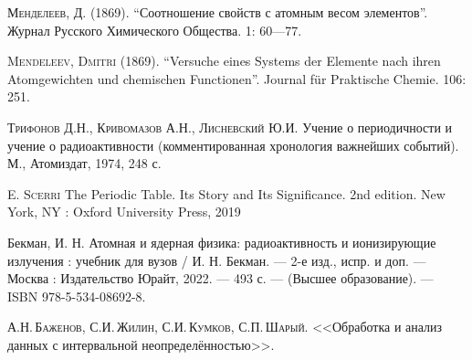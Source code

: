 \documentclass[a5paper,openany]{book}
\begin{document}
			\begin{thebibliography}{00}
				\textsc{Менделеев, Д.} (1869). “Соотношение свойств с атомным весом элементов”. Журнал Русского Химического Общества. 1: 60—77.
				
				\textsc{Mendeleev, Dmitri} (1869). “Versuche eines Systems der Elemente nach ihren Atomgewichten und chemischen Functionen”. Journal für Praktische Chemie. 106: 251.
				
				\textsc{Трифонов Д.Н., Кривомазов А.Н., Лисневский Ю.И.} Учение о периодичности и учение о радиоактивности (комментированная хронология важнейших событий). М., Атомиздат, 1974, 248 с.
				
				\textsc{E. Scerri}
				The Periodic Table. Its Story and Its Significance. 
				2nd edition.  New York, NY : Oxford University Press, 2019 
				
				
				Бекман, И. Н.  Атомная и ядерная физика: радиоактивность и ионизирующие излучения : учебник для вузов / И. Н. Бекман. — 2-е изд., испр. и доп. — Москва : Издательство Юрайт, 2022. — 493 с. — (Высшее образование). — ISBN 978-5-534-08692-8. 
				
				
				 \textsc{А.Н.\,Баженов, С.И.\,Жилин, С.И.\,Кумков, С.П.\,Шарый.} <<Обработка и анализ данных с интервальной неопределённостью>>. 
				
			\end{thebibliography}
			
			\raggedright\small\printindex 
			
		
\end{document}
